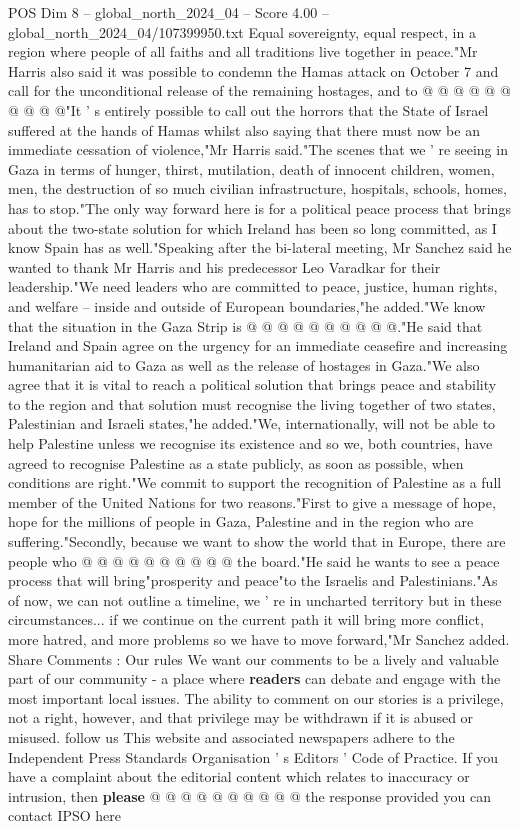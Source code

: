 \begin{textsample}{POS Dim 8 – global\_north\_2024\_04 – Score 4.00 – global\_north\_2024\_04/107399950.txt}
Equal sovereignty, equal respect, in a region where people of all faiths and all traditions live together in peace."Mr Harris also said it was possible to condemn the Hamas attack on October 7 and call for the unconditional release of the remaining hostages, and to @ @ @ @ @ @ @ @ @ @"It ' s entirely possible to call out the horrors that the State of Israel suffered at the hands of Hamas whilst also saying that there must now be an immediate cessation of violence,"Mr Harris said."The scenes that we ' re seeing in Gaza in terms of hunger, thirst, mutilation, death of innocent children, women, men, the destruction of so much civilian infrastructure, hospitals, schools, homes, has to stop."The only way forward here is for a political peace process that brings about the two-state solution for which Ireland has been so long committed, as I know Spain has as well."Speaking after the bi-lateral meeting, Mr Sanchez said he wanted to thank Mr Harris and his predecessor Leo Varadkar for their leadership."We need leaders who are committed to peace, justice, human rights, and welfare -- inside and outside of European boundaries,"he added."We know that the situation in the Gaza Strip is @ @ @ @ @ @ @ @ @ @."He said that Ireland and Spain agree on the urgency for an immediate ceasefire and increasing humanitarian aid to Gaza as well as the release of hostages in Gaza."We also agree that it is vital to reach a political solution that brings peace and stability to the region and that solution must recognise the living together of two states, Palestinian and Israeli states,"he added."We, internationally, will not be able to help Palestine unless we recognise its existence and so we, both countries, have agreed to recognise Palestine as a state publicly, as soon as possible, when conditions are right."We commit to support the recognition of Palestine as a full member of the United Nations for two reasons."First to give a message of hope, hope for the millions of people in Gaza, Palestine and in the region who are suffering."Secondly, because we want to show the world that in Europe, there are people who @ @ @ @ @ @ @ @ @ @ the board."He said he wants to see a peace process that will bring"prosperity and peace"to the Israelis and Palestinians."As of now, we can not outline a timeline, we ' re in uncharted territory but in these circumstances... if we continue on the current path it will bring more conflict, more hatred, and more problems so we have to move forward,"Mr Sanchez added.
Share Comments : Our rules We want our comments to be a lively and valuable part of our community - a place where \textbf{readers} can debate and engage with the most important local issues.
The ability to comment on our stories is a privilege, not a right, however, and that privilege may be withdrawn if it is abused or misused. follow us This website and associated newspapers adhere to the Independent Press Standards Organisation ' s Editors ' Code of Practice.
If you have a complaint about the editorial content which relates to inaccuracy or intrusion, then \textbf{please} @ @ @ @ @ @ @ @ @ @ the response provided you can contact IPSO here

\end{textsample}
